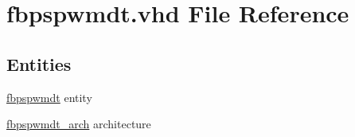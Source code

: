 \hypertarget{fbpspwmdt_8vhd}{}\section{fbpspwmdt.\+vhd File Reference}
\label{fbpspwmdt_8vhd}
\subsection*{Entities}
\begin{DoxyCompactItemize}
\item 
\hyperlink{classfbpspwmdt}{fbpspwmdt} entity
\item 
\hyperlink{classfbpspwmdt_1_1fbpspwmdt__arch}{fbpspwmdt\+\_\+arch} architecture
\end{DoxyCompactItemize}
